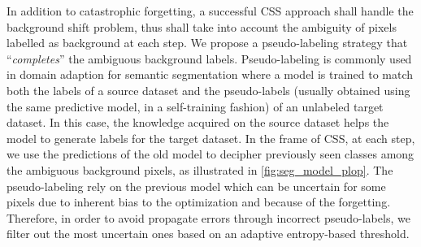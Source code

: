 In addition to catastrophic forgetting, a successful \ac{CSS} approach shall handle the background shift
problem, thus shall take into account the ambiguity of pixels labelled as background at each step.
We propose a pseudo-labeling strategy that ``\textit{completes}'' the ambiguous background labels.
Pseudo-labeling \citep{lee2013pseudolabel} is commonly used in domain adaption for semantic
segmentation
\citep{vu2019advent,li2019bidirectionallearning,zou2018classbalancedselftraining,saporta2020esl}
where a model is trained to match both the labels of a source dataset and the pseudo-labels (usually
obtained using the same predictive model, in a self-training fashion) of an unlabeled target
dataset. In this case, the knowledge acquired on the source dataset helps the model to generate
labels for the target dataset. In the frame of \ac{CSS}, at each step, we use the predictions of the old
model to decipher previously seen classes among the ambiguous background pixels, as illustrated in
\autoref{fig:seg_model_plop}. The pseudo-labeling rely on the previous model which can be uncertain
for some pixels due to inherent bias to the optimization and because of the forgetting. Therefore,
in order to avoid propagate errors through incorrect pseudo-labels, we filter out the most uncertain
ones based on an adaptive entropy-based threshold.

